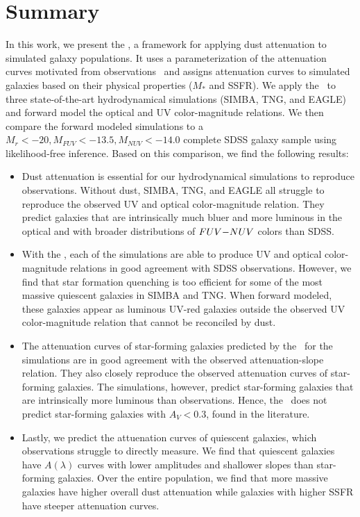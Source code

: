 \section{Summary}
In this work, we present the \eda, a framework for applying dust attenuation to
simulated galaxy populations. It uses a parameterization of 
the attenuation curves motivated from observations~\citep{noll2009} and
assigns attenuation curves to simulated galaxies based on their physical properties ($M_*$ and SSFR).
We apply the \eda~to 
three state-of-the-art hydrodynamical simulations (SIMBA, TNG, and EAGLE) and
forward model the optical and UV color-magnitude relations. We then compare
the forward modeled simulations to a $M_r < -20, M_{FUV} < -13.5, M_{NUV} <
-14.0$ complete SDSS galaxy sample using likelihood-free inference. Based on
this comparison, we find the following results: 

\begin{itemize}
    \item Dust attenuation is essential for our hydrodynamical simulations to
        reproduce observations.
        Without dust, SIMBA, TNG, and EAGLE all struggle to reproduce the
        observed UV and optical color-magnitude relation. 
        They predict galaxies that are intrinsically much bluer and more
        luminous in the optical and with broader distributions of $FUV{-}NUV$
        colors than SDSS. 
    \item With the \eda, each of the simulations are able to produce UV and
        optical color-magnitude relations in good agreement with SDSS
        observations. 
        However, we find that star formation quenching is too efficient for
        some of the most massive quiescent galaxies in SIMBA and TNG. 
        When forward modeled, these galaxies appear as luminous UV-red
        galaxies outside the observed UV color-magnitude relation that 
        cannot be reconciled by dust. 
    \item The attenuation curves of star-forming galaxies predicted by the
        \eda~for the simulations are in good agreement with the observed
        attenuation-slope relation. 
        They also closely reproduce the observed attenuation curves
        of star-forming galaxies. 
        The simulations, however, predict star-forming galaxies that are
        intrinsically more luminous than observations. Hence, the \eda~does
        not predict star-forming galaxies with $A_V < 0.3$, found in the
        literature. 
    \item Lastly, we predict the attuenation curves of
        quiescent galaxies, which observations struggle to directly
        measure.
        We find that quiescent galaxies have $A(\lambda)$ curves
        with lower amplitudes and shallower slopes than star-forming
        galaxies. 
        Over the entire population, we find that more massive galaxies have
        higher overall dust attenuation while galaxies with higher SSFR
        have steeper attenuation curves. 
\end{itemize}

